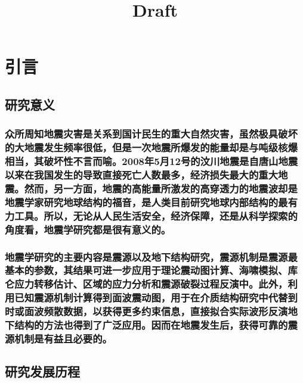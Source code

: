 \documentclass[a4paper,12pt,single,pdftex]{scrartcl}
\title{Draft}
\begin{document}
 
\maketitle
\newpage

\label{ID_492861276}\label{ID_1956039038}\section{引言}

\label{ID_1883815321}\subsection{研究意义}

\label{ID_84459052}\subsubsection{众所周知地震灾害是关系到国计民生的重大自然灾害，虽然极具破坏的大地震发生频率很低，但是一次地震所爆发的能量却是与吨级核爆相当\citep{Stein2003}，其破坏性不言而喻。2008年5月12号的汶川地震是自唐山地震以来在我国发生的导致直接死亡人数最多，经济损失最大的重大地震。然而，另一方面，地震的高能量所激发的高穿透力的地震波却是地震学家研究地球结构的福音，是人类目前研究地球内部结构的最有力工具。所以，无论从人民生活安全，经济保障，还是从科学探索的角度看，地震学研究都是很有意义的。}

\label{ID_219947997}\subsubsection{地震学研究的主要内容是震源以及地下结构研究，震源机制是震源最基本的参数，其结果可进一步应用于理论震动图计算\citep{Wald2005}、海啸模拟\citep{Satake2007}、库仑应力转移估计\citep{King2007}、区域的应力分析和震源破裂过程反演中\citep{Kilb2001}。此外，利用已知震源机制计算得到面波震动图，用于在介质结构研究中代替到时或面波频散数据，以获得更多约束信息，直接拟合实际波形反演地下结构的方法也得到了广泛应用\citep{Nolet1990,Manaman2011,Friederich2003,Zielhuis1994,Cao2001,Lee1997}。因而在地震发生后，获得可靠的震源机制是有益且必要的。}

\label{ID_1577841117}\subsection{研究发展历程}

\label{ID_851024883}\subsubsection{}
\end{document}
